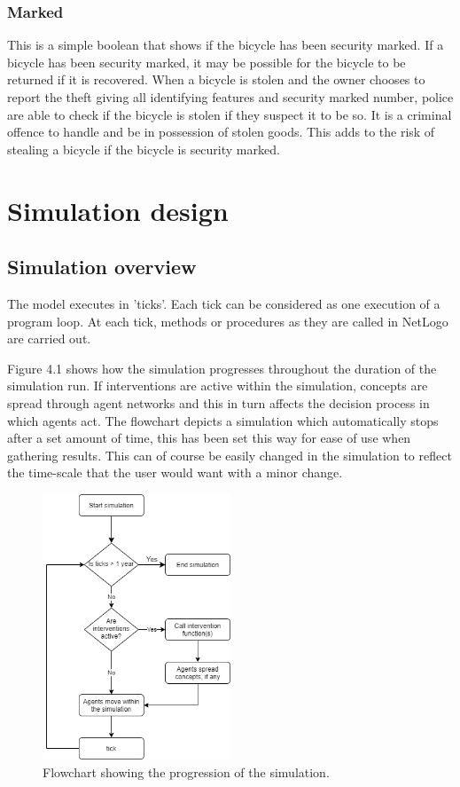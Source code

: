 \documentclass[11pt]{informatics-report}
\begin{document}
\subsubsection{Marked}
This is a simple boolean that shows if the bicycle has been security marked. If a bicycle has been security marked, it may be possible for the bicycle to be returned if it is recovered. When a bicycle is stolen and the owner chooses to report the theft giving all identifying features and security marked number, police are able to check if the bicycle is stolen if they suspect it to be so. It is a criminal offence to handle and be in possession of stolen goods. This adds to the risk of stealing a bicycle if the bicycle is security marked.

\section{Simulation design}
\subsection{Simulation overview}
The model executes in 'ticks'. Each tick can be considered as one execution of a program loop. At each tick, methods or procedures as they are called in NetLogo are carried out. 

Figure 4.1 shows how the simulation progresses throughout the duration of the simulation run. If interventions are active within the simulation, concepts are spread through agent networks and this in turn affects the decision process in which agents act. The flowchart depicts a simulation which automatically stops after a set amount of time, this has been set this way for ease of use when gathering results. This can of course be easily changed in the simulation to reflect the time-scale that the user would want with a minor change.
\begin{figure}[h]
\centering
\includegraphics[width = 0.5\textwidth]{flow.png}
\caption{Flowchart showing the progression of the simulation.}
\end{figure}
\end{document}
